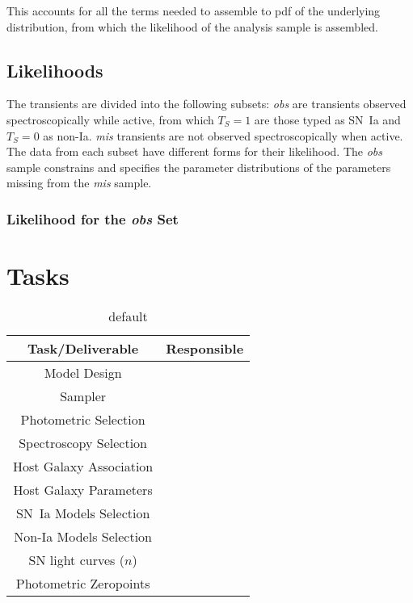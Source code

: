 \documentclass[preprint,3p]{elsarticle}
\begin{document}
This accounts for all the terms needed to assemble to pdf of the underlying distribution,
from which the likelihood of the analysis sample is assembled.

\subsection{Likelihoods}
The transients are divided into
the following subsets:
{\it obs} are transients observed spectroscopically while active, from which $T_S=1$ are those typed
as SN~Ia and $T_S=0$ as non-Ia.  {\it mis} transients are not observed
spectroscopically when active.  The data from each subset have different forms for their likelihood.
The  {\it obs} sample constrains and specifies the parameter distributions of the 
parameters missing from the {\it mis} sample.

\subsubsection{Likelihood for the {\it obs} Set}


\section{Tasks}
\begin{table}[htdp]
\caption{default}
\begin{center}
\begin{tabular}{|c|c|}
\hline
Task/Deliverable & Responsible \\ \hline
Model Design & \\
Sampler &\\
Photometric Selection &\\
Spectroscopy Selection &\\
Host Galaxy Association &\\
Host Galaxy Parameters &\\
SN~Ia Models Selection &\\
Non-Ia Models Selection &\\
SN light curves ($n$) &\\
Photometric Zeropoints &\\
\hline
\end{tabular}
\end{center}
\label{Tasks and Responsible Parties}
\end{table}%
\end{document}
